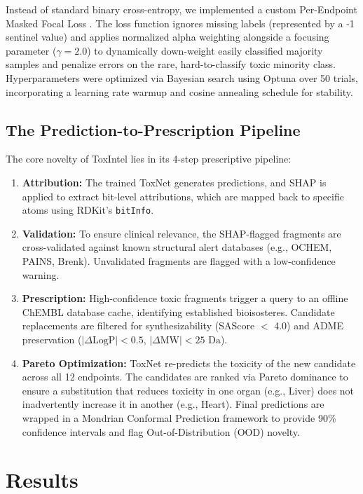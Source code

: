 \documentclass[lettersize,journal]{IEEEtran}
\begin{document}
Instead of standard binary cross-entropy, we implemented a custom Per-Endpoint Masked Focal Loss \cite{ref3}. The loss function ignores missing labels (represented by a -1 sentinel value) and applies normalized alpha weighting alongside a focusing parameter ($\gamma=2.0$) to dynamically down-weight easily classified majority samples and penalize errors on the rare, hard-to-classify toxic minority class. Hyperparameters were optimized via Bayesian search using Optuna over 50 trials, incorporating a learning rate warmup and cosine annealing schedule for stability.

\subsection{The Prediction-to-Prescription Pipeline}
The core novelty of ToxIntel lies in its 4-step prescriptive pipeline:
\begin{enumerate}
\item \textbf{Attribution:} The trained ToxNet generates predictions, and SHAP \cite{ref4} is applied to extract bit-level attributions, which are mapped back to specific atoms using RDKit's \texttt{bitInfo}.
\item \textbf{Validation:} To ensure clinical relevance, the SHAP-flagged fragments are cross-validated against known structural alert databases (e.g., OCHEM, PAINS, Brenk). Unvalidated fragments are flagged with a low-confidence warning.
\item \textbf{Prescription:} High-confidence toxic fragments trigger a query to an offline ChEMBL database cache, identifying established bioisosteres. Candidate replacements are filtered for synthesizability (SAScore $<$ 4.0) and ADME preservation ($|\Delta\text{LogP}| < 0.5$, $|\Delta\text{MW}| < 25 \text{ Da}$).
\item \textbf{Pareto Optimization:} ToxNet re-predicts the toxicity of the new candidate across all 12 endpoints. The candidates are ranked via Pareto dominance to ensure a substitution that reduces toxicity in one organ (e.g., Liver) does not inadvertently increase it in another (e.g., Heart). Final predictions are wrapped in a Mondrian Conformal Prediction framework to provide 90\% confidence intervals and flag Out-of-Distribution (OOD) novelty.
\end{enumerate}

\section{Results}
\end{document}
